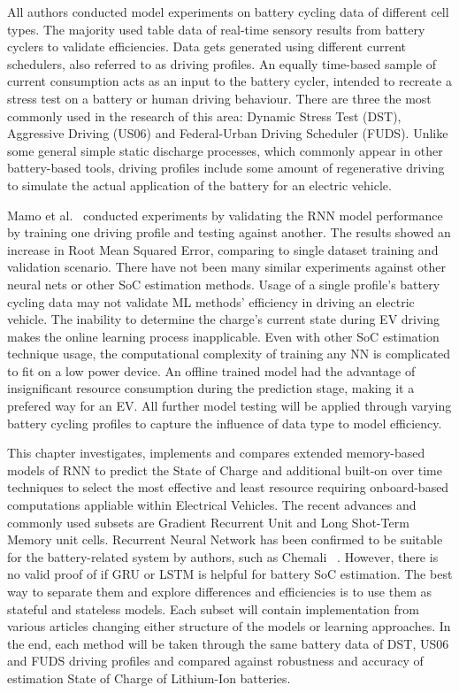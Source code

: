 %
%
All authors conducted model experiments on battery cycling data of different cell types.
The majority used table data of real-time sensory results from battery cyclers to validate efficiencies.
Data gets generated using different current schedulers, also referred to as driving profiles.
An equally time-based sample of current consumption acts as an input to the battery cycler, intended to recreate a stress test on a battery or human driving behaviour.
There are three the most commonly used in the research of this area: Dynamic Stress Test (DST), Aggressive Driving (US06) and Federal-Urban Driving Scheduler (FUDS).
Unlike some general simple static discharge processes, which commonly appear in other battery-based tools, driving profiles include some amount of regenerative driving to simulate the actual application of the battery for an electric vehicle.

%
%
Mamo et al.~\cite{mamo_long_2020} conducted experiments by validating the RNN model performance by training one driving profile and testing against another.
The results showed an increase in Root Mean Squared Error, comparing to single dataset training and validation scenario.
There have not been many similar experiments against other neural nets or other SoC estimation methods.
Usage of a single profile's battery cycling data may not validate ML methods' efficiency in driving an electric vehicle.
The inability to determine the charge's current state during EV driving makes the online learning process inapplicable.
Even with other SoC estimation technique usage, the computational complexity of training any NN is complicated to fit on a low power device.
An offline trained model had the advantage of insignificant resource consumption during the prediction stage, making it a prefered way for an EV.
All further model testing will be applied through varying battery cycling profiles to capture the influence of data type to model efficiency.

%
%
This chapter investigates, implements and compares extended memory-based models of RNN to predict the State of Charge and additional built-on over time techniques to select the most effective and least resource requiring onboard-based computations appliable within Electrical Vehicles.
The recent advances and commonly used subsets are Gradient Recurrent Unit and Long Shot-Term Memory unit cells.
Recurrent Neural Network has been confirmed to be suitable for the battery-related system by authors, such as Chemali ~\cite{LSTM_Hochreiter1997}.
However, there is no valid proof of if GRU or LSTM is helpful for battery SoC estimation.
The best way to separate them and explore differences and efficiencies is to use them as stateful and stateless models.
Each subset will contain implementation from various articles changing either structure of the models or learning approaches.
In the end, each method will be taken through the same battery data of DST, US06 and FUDS driving profiles and compared against robustness and accuracy of estimation State of Charge of Lithium-Ion batteries.

